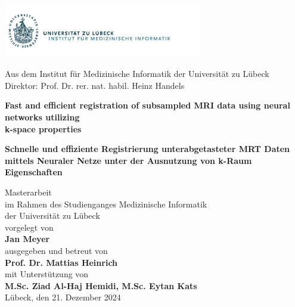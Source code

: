 
\addtolength{\topmargin}{-1.2cm} 
\addtolength{\textwidth}{2.35cm} 

\vspace*{-2.7cm}
\hspace*{-2cm}
\includegraphics[width=0.65\textwidth]{./images/Logo_IMI}
\vspace*{0.4cm}
\begin{center}


\enlargethispage{5cm}
Aus dem Institut für Medizinische Informatik 
der Universität zu Lübeck\\
Direktor: Prof. Dr. rer. nat. habil. Heinz Handels\\[1.8cm]

\begin{Large}
\textcolor{Ocean}{{\textbf{Fast and efficient registration of subsampled MRI data using neural networks utilizing\\k-space properties} }}\\ 
\end{Large}
\vspace*{1.5cm}
\begin{large}
{{\textbf{Schnelle und effiziente Registrierung unterabgetasteter MRT Daten mittels Neuraler Netze unter der Ausnutzung von k-Raum Eigenschaften} }}\\ 
\end{large}
\vspace*{2.5cm}
%
Masterarbeit\\ 
im Rahmen des Studienganges Medizinische Informatik\\
der Universität zu Lübeck\\[1.0cm]
%
vorgelegt von\\[0.1cm]
\textbf{Jan Meyer}\\[1.0cm]
%
ausgegeben und betreut von\\[0.1cm]
\textbf{Prof. Dr. Mattias Heinrich}\\[0.3cm]
mit Unterstützung von\\[0.1cm]
\textbf{M.Sc. Ziad Al-Haj Hemidi, M.Sc. Eytan Kats}\\[2.8cm]
%
Lübeck, den 21. Dezember 2024
\end{center}
  
